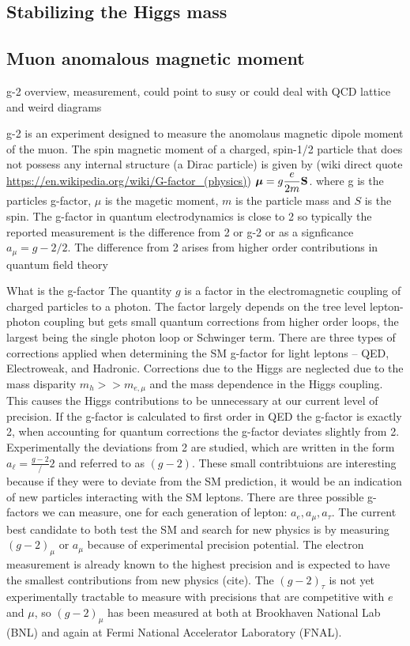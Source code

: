 \subsection{Stabilizing the Higgs mass}



\subsection{Muon anomalous magnetic moment}
g-2 overview, measurement, could point to susy or could deal with QCD lattice and weird diagrams

g-2 is an experiment designed to measure the anomolaus magnetic dipole moment of the muon. The spin magnetic moment of a charged, spin-1/2 particle that does not possess any internal structure (a Dirac particle) is given by (wiki direct quote \url{https://en.wikipedia.org/wiki/G-factor_(physics)}) ${\displaystyle {\boldsymbol {\mu }}=g{e \over 2m}\mathbf {S} }$. where g is the particles g-factor, $\mu$ is the magetic moment, $m$ is the particle mass and $S$ is the spin. The g-factor in quantum electrodynamics is close to 2 so typically the reported measurement is the difference from 2 or g-2 or as a signficance $a_\mu = g-2/2$. The difference from 2 arises from higher order contributions in quantum field theory


What is the g-factor
The quantity $g$ is a factor in the electromagnetic coupling of charged particles to a photon. The factor largely depends on the tree level lepton-photon coupling but gets small quantum corrections from higher order loops, the largest being the single photon loop or Schwinger term. There are three types of corrections applied when determining the SM g-factor for light leptons -- QED, Electroweak, and Hadronic. Corrections due to the Higgs are neglected due to the mass disparity $m_h >> m_{e,\mu}$ and the mass dependence in the Higgs coupling. This causes the Higgs contributions to be unnecessary at our current level of precision. If the g-factor is calculated to first order in QED the g-factor is exactly 2, when accounting for quantum corrections the g-factor deviates slightly from 2. Experimentally the deviations from 2 are studied, which are written in the form $a_\ell = \frac{g-2}/2$ and referred to as $(g-2)$. These small contribtuions are interesting because if they were to deviate from the SM prediction, it would be an indication of new particles interacting with the SM leptons.  There are three possible g-factors we can measure, one for each generation of lepton: $a_e, a_\mu, a_\tau$. The current best candidate to both test the SM and search for new physics is by measuring $(g-2)_\mu$ or $a_\mu$ because of  experimental precision potential. The electron measurement is already known to the highest precision and is expected to have the smallest contributions from new physics (cite). The $(g-2)_\tau$ is not yet experimentally tractable to measure with precisions that are competitive with $e$ and $\mu$, so $(g-2)_\mu$ has been measured at both at Brookhaven National Lab (BNL) and again at Fermi National Accelerator Laboratory (FNAL).

